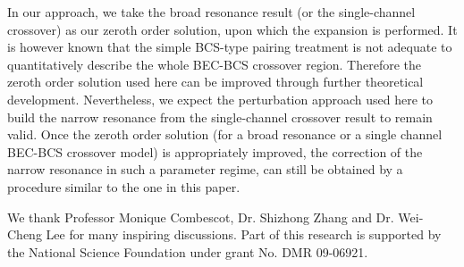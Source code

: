 \documentclass[reprint,pra]{revtex4-1}
\begin{document}


     In our approach, we take the broad resonance result (or the single-channel crossover) as our zeroth order solution, upon which the expansion is performed.  It is however known that the simple BCS-type pairing treatment is not adequate  to quantitatively describe the whole BEC-BCS crossover region.  Therefore the zeroth order solution used here can be improved through further theoretical development.  Nevertheless, we expect the perturbation approach used here to build the narrow resonance from the single-channel crossover result to remain valid.  Once the zeroth order solution (for a broad resonance or a single channel BEC-BCS crossover model) is appropriately improved, the correction of the narrow resonance in such a parameter regime, can still be obtained by  a procedure similar to the one in this paper.  


\begin{acknowledgements}
We thank  Professor Monique Combescot, Dr. Shizhong Zhang and  Dr. Wei-Cheng Lee for many inspiring discussions. Part of this research  is supported  by the National Science Foundation under grant No. DMR 09-06921. 

\end{acknowledgements}

\end{document}
